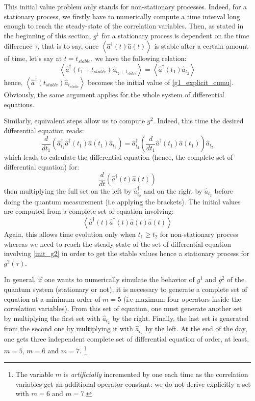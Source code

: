 \documentclass[11pt]{report}
\begin{document}
This initial value problem only stands for non-stationary processes. Indeed, for a stationary process, we firstly have to numerically compute a time interval long enough to reach the steady-state of the correlation variables. Then, as stated in the beginning of this section, $g^1$ for a stationary process is dependent on the time difference $\tau$, that is to say, once $\left\langle\hat{a}^\dagger(t)\hat{a}(t)\right\rangle$ is stable after a certain amount of time, let's say at $t=t_{stable}$, we have the following relation:
\begin{equation}
\left\langle\hat{a}^\dagger(t_1 + t_{stable})\hat{a}_{t_2 + t_{stable}}\right\rangle = \left\langle\hat{a}^\dagger(t_1)\hat{a}_{t_2}\right\rangle
\end{equation}
hence, $\left\langle\hat{a}^\dagger(t_{stable})\hat{a}_{t_{stable}}\right\rangle$ becomes the initial value of \eqref{g1_explicit_cumu}. Obviously, the same argument applies for the whole system of differential equations.

Similarly, equivalent steps allow us to compute $g^2$. Indeed, this time the desired differential equation reads:
\begin{equation}
\frac{d}{dt_1} \left(\hat{a}^\dagger_{t_2}\hat{a}^\dagger(t_1)\hat{a}(t_1)\hat{a}_{t_2}\right) = \hat{a}^\dagger_{t_2} \left(\frac{d}{dt_1} \hat{a}^\dagger(t_1)\hat{a}(t_1)\right)\hat{a}_{t_2}
\end{equation}
which leads to calculate the differential equation (hence, the complete set of differential equation) for:
\begin{equation}
\frac{d}{dt} \left(\hat{a}^\dagger(t)\hat{a}(t)\right)
\end{equation}
then multiplying the full set on the left by $\hat{a}^\dagger_{t_2}$ and on the right by $\hat{a}_{t_2}$ before doing the quantum measurement (i.e applying the brackets). The initial values are computed from a complete set of equation involving:
\begin{equation}
\label{init_g2}
\left\langle\hat{a}^\dagger(t)\hat{a}^\dagger(t)\hat{a}(t)\hat{a}(t)\right\rangle
\end{equation}
Again, this allows time evolution only when $t_1\geqslant t_2$ for non-stationary process whereas we need to reach the steady-state of the set of differential equation involving \eqref{init_g2} in order to get the stable values hence a stationary process for $g^2(\tau)$.

In general, if one wants to numerically simulate the behavior of $g^1$ and $g^2$ of the quantum system (stationary or not), it is necessary to generate a complete set of equation at a minimum order of $m=5$ (i.e maximum four operators inside the correlation variables). From this set of equation, one must generate another set by multiplying the first set with $\hat{a}_{t_2}$ by the right. Finally, the last set is generated from the second one by multiplying it with $\hat{a}^\dagger_{t_2}$ by the left. At the end of the day, one gets three independent complete set of differential equation of order, at least, $m=5$, $m=6$ and $m=7$. \footnote{The variable $m$ is \textit{artificially} incremented by one each time as the correlation variables get an additional operator constant: we do not derive explicitly a set with $m=6$ and $m=7$.}
\end{document}
